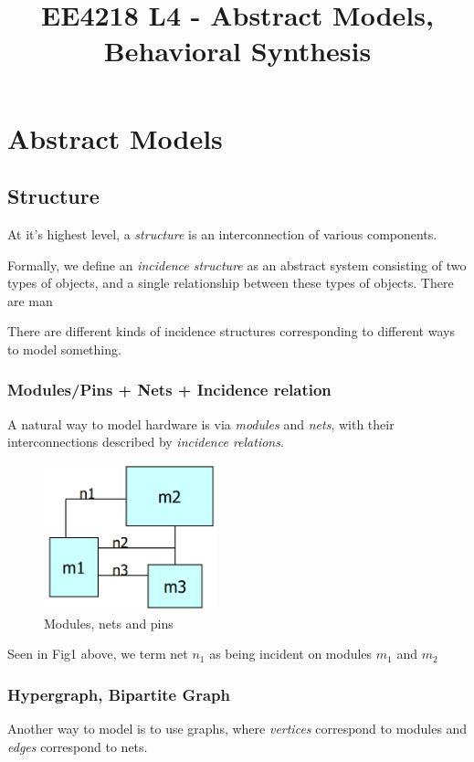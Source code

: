 \documentclass{article}
\title{\vspace{-2cm} EE4218 L4 - Abstract Models, Behavioral Synthesis}
\date{\vspace{-5ex}}
\begin{document}
\maketitle

\section{Abstract Models}
\subsection{Structure}
At it's highest level, a \textit{structure} is an interconnection of various components.

Formally, we define an \textit{incidence structure} as an abstract system consisting of two types of objects, and a single relationship between these types of objects. There are man

There are different kinds of incidence structures corresponding to different ways to model something.

\subsubsection{Modules/Pins + Nets + Incidence relation}
A natural way to model hardware is via \textit{modules} and \textit{nets}, with their interconnections described by \textit{incidence relations}.

\begin{figure}[htp]
    \centering
    \includegraphics[width=5cm, scale=1]{S1/modulesNetsRelations.PNG}
    \caption{Modules, nets and pins}
\end{figure}

Seen in Fig1 above, we term net \textit{$n_{1}$} as being incident on modules \textit{$m_{1}$} and \textit{$m_{2}$}

\subsubsection{Hypergraph, Bipartite Graph}
Another way to model is to use graphs, where \textit{vertices} correspond to modules and \textit{edges} correspond to nets.
\end{document}
